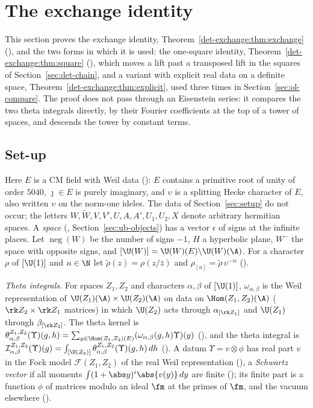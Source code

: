 \section{The exchange identity}\label{sec:det-exchange}

This section proves the exchange identity, Theorem~\ref{det-exchange:thm:exchange}
(), and the two forms in which it is used: the one-square
identity, Theorem~\ref{det-exchange:thm:square}
(), which moves a lift past a transposed
lift in the squares of Section~\ref{sec:det-chain}, and a variant with explicit real data on a
definite space, Theorem~\ref{det-exchange:thm:explicit}, used three times in
Section~\ref{sec:ol-compare}. The proof does not pass through an Eisenstein series: it compares the
two theta integrals directly, by their Fourier coefficients at the top of a tower of spaces, and
descends the tower by constant terms.

\subsection{Set-up}\label{det-exchange:sec:setup}

Here $E$ is a CM field with Weil data (): $E$ contains a primitive root of
unity of order $5040$, $\jmath\in E$ is purely imaginary, and $\upsilon$ is a splitting Hecke
character of $E$, also written $\upsilon$ on the norm-one ideles. The data of
Section~\ref{sec:setup} do not occur; the letters $W,\widetilde W,V,V',U,A,A',U_1,U_2,X$ denote arbitrary
hermitian spaces. A \emph{space} (, Section~\ref{sec:ub-objects}) has a vector
$\epsilon$ of signs at the infinite places. Let $\operatorname{neg}(W)$ be the number of
signs $-1$, $H$ a hyperbolic plane, $W^-$ the space with opposite signs, and
$[\U(W)]=\U(W)(E)\backslash\U(W)(\A)$. For a character $\rho$ of $[\U(1)]$ and $n\in\N$ let
$\tilde\rho(z)=\rho(z/\bar z)$ and $\rho_{[n]}=\tilde\rho\,\upsilon^{-n}$
().

\emph{Theta integrals.} For spaces $Z_1,Z_2$ and characters $\alpha,\beta$ of $[\U(1)]$,
$\omega_{\alpha,\beta}$ is the Weil representation of $\U(Z_1)(\A)\times\U(Z_2)(\A)$ on data on
$\Hom(Z_1,Z_2)(\A)$ ($\rk Z_2\times\rk Z_1$ matrices) in which $\U(Z_2)$ acts through
$\alpha_{[\rk Z_1]}$ and $\U(Z_1)$ through $\beta_{[\rk Z_2]}$. The theta kernel is
$\theta^{Z_1,Z_2}_{\alpha,\beta}(\Upsilon)(g,h)=\sum_{y\in\Hom(Z_1,Z_2)(E)}(\omega_{\alpha,\beta}(g,h)
\Upsilon)(y)$ (), and the theta integral is
$\mathcal I^{Z_1,Z_2}_{\alpha,\beta}(\Upsilon)(g)=\int_{[\U(Z_2)]}\theta^{Z_1,Z_2}_{\alpha,\beta}
(\Upsilon)(g,h)\,dh$ (). A datum $\Upsilon=v\otimes\phi$ has real
part $v$ in the Fock model $\mathcal F(Z_1,Z_2)$ of the real Weil representation
(), a \emph{Schwartz vector} if all moments $\int(1+\abs y)^i\abs{v(y)}\,dy$ are
finite (); its finite part is a function $\phi$ of matrices
modulo an ideal $\fm$ at the primes of $\fm$, and the vacuum elsewhere ().

